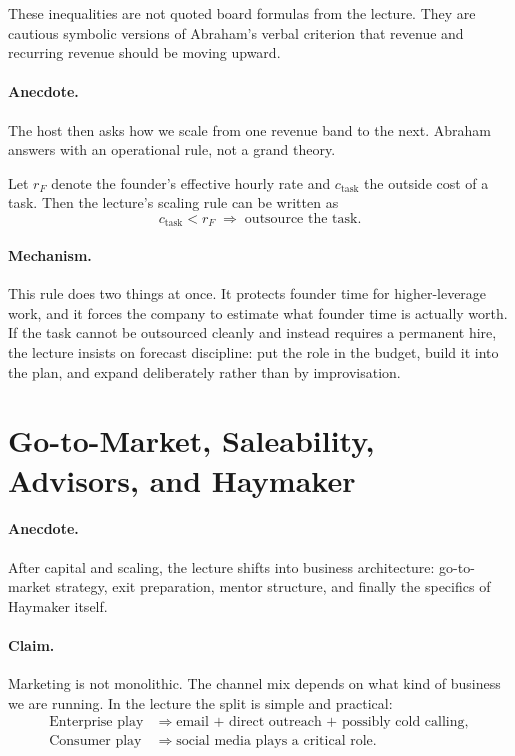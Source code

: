 \begin{remark}
These inequalities are not quoted board formulas from the lecture. They are cautious symbolic versions of Abraham's verbal criterion that revenue and recurring revenue should be moving upward.
\end{remark}

\paragraph{Anecdote.} The host then asks how we scale from one revenue band to the next. Abraham answers with an operational rule, not a grand theory.

Let \(r_F\) denote the founder's effective hourly rate and \(c_{\text{task}}\) the outside cost of a task. Then the lecture's scaling rule can be written as
\begin{equation}
c_{\text{task}} < r_F
\;\Rightarrow\;
\text{outsource the task}.
\end{equation}

\paragraph{Mechanism.} This rule does two things at once. It protects founder time for higher-leverage work, and it forces the company to estimate what founder time is actually worth. If the task cannot be outsourced cleanly and instead requires a permanent hire, the lecture insists on forecast discipline: put the role in the budget, build it into the plan, and expand deliberately rather than by improvisation.

\section{Go-to-Market, Saleability, Advisors, and Haymaker}

\paragraph{Anecdote.} After capital and scaling, the lecture shifts into business architecture: go-to-market strategy, exit preparation, mentor structure, and finally the specifics of Haymaker itself.

\paragraph{Claim.} Marketing is not monolithic. The channel mix depends on what kind of business we are running. In the lecture the split is simple and practical:
\begin{align}
\text{Enterprise play}
&\Rightarrow \text{email + direct outreach + possibly cold calling},\\
\text{Consumer play}
&\Rightarrow \text{social media plays a critical role}.
\end{align}

